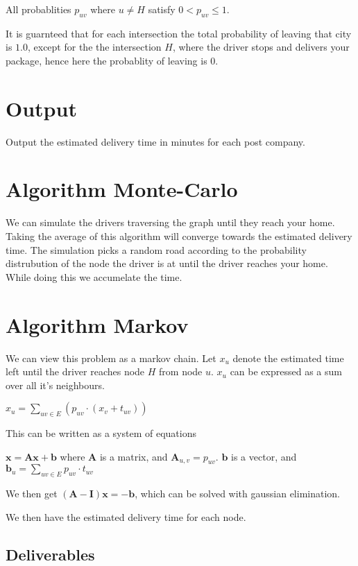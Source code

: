 \documentclass{tufte-handout}
\begin{document}
\medskip

All probablities $p_{uv}$ where $u \neq H$ satisfy $0 < p_{uv} \leq 1$.

It is guarnteed that for each intersection the total probability of leaving that city is $1.0$,
except for the the intersection $H$, where the driver stops and delivers your package, hence here the probablity of leaving is 0.

\section*{Output}
Output the estimated delivery time in minutes for each post company.


\section*{Algorithm Monte-Carlo}
We can simulate the drivers traversing the graph until they reach your home.
Taking the average of this algorithm will converge towards the estimated delivery time.
The simulation picks a random road according to the probability distrubution 
of the node the driver is at until the driver reaches your home. While doing this we accumelate the time.


\section*{Algorithm Markov}
We can view this problem as a markov chain. 
Let $x_u$ denote the estimated time left until the driver reaches node $H$ from node $u$.
$x_u$ can be expressed as a sum over all it's neighbours.

$x_u = \sum_{uv \in E} (p_{uv}\cdot (x_v + t_{uv}))$

This can be written as a system of equations

$\bm{x} = \bm{Ax} + \bm{b}$
where $\bm{A}$ is a matrix, and $\bm{A}_{u,v} = p_{uv}$. $\bm{b}$ is a vector, and $\bm{b}_u = \sum_{uv \in E}{p_{uv}\cdot t_{uv}}$

We then get $(\bm{A}-\bm{I})\bm{x} = -\bm{b}$, which can be solved with gaussian elimination.

We then have the estimated delivery time for each node.

\subsection{Deliverables}
\end{document}
